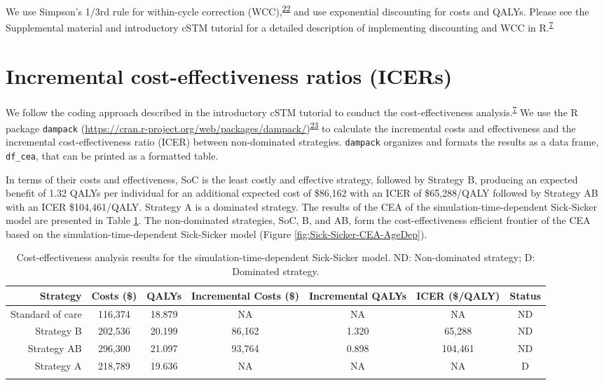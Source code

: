 \documentclass[
]{article}
\begin{document}
We use Simpson's 1/3rd rule for within-cycle correction (WCC),\textsuperscript{\protect\hyperlink{ref-Elbasha2016a}{22}} and use exponential discounting for costs and QALYs. Please see the Supplemental material and introductory cSTM tutorial for a detailed description of implementing discounting and WCC in R.\textsuperscript{\protect\hyperlink{ref-Alarid-Escudero2021a}{7}}

\hypertarget{incremental-cost-effectiveness-ratios-icers}{%
\section{Incremental cost-effectiveness ratios (ICERs)}\label{incremental-cost-effectiveness-ratios-icers}}

We follow the coding approach described in the introductory cSTM tutorial to conduct the cost-effectiveness analysis.\textsuperscript{\protect\hyperlink{ref-Alarid-Escudero2021a}{7}} We use the R package \texttt{dampack} (\url{https://cran.r-project.org/web/packages/dampack/})\textsuperscript{\protect\hyperlink{ref-Alarid-Escudero2021}{23}} to calculate the incremental costs and effectiveness and the incremental cost-effectiveness ratio (ICER) between non-dominated strategies. \texttt{dampack} organizes and formats the results as a data frame, \texttt{df\_cea}, that can be printed as a formatted table.

In terms of their costs and effectiveness, SoC is the least costly and effective strategy, followed by Strategy B, producing an expected benefit of 1.32 QALYs per individual for an additional expected cost of \$86,162 with an ICER of \$65,288/QALY followed by Strategy AB with an ICER \$104,461/QALY. Strategy A is a dominated strategy. The results of the CEA of the simulation-time-dependent Sick-Sicker model are presented in Table \ref{tab:table-cea}. The non-dominated strategies, SoC, B, and AB, form the cost-effectiveness efficient frontier of the CEA based on the simulation-time-dependent Sick-Sicker model (Figure \ref{fig:Sick-Sicker-CEA-AgeDep}).

\begin{table}[!h]

\caption{\label{tab:table-cea}Cost-effectiveness analysis results for the simulation-time-dependent Sick-Sicker model. ND: Non-dominated strategy; D: Dominated strategy.}
\centering
\begin{tabular}[t]{rcccccc}
\toprule{}
Strategy & Costs (\$) & QALYs & Incremental Costs (\$) & Incremental QALYs & ICER (\$/QALY) & Status\\
\midrule{}
Standard of care & 116,374 & 18.879 & NA & NA & NA & ND\\
Strategy B & 202,536 & 20.199 & 86,162 & 1.320 & 65,288 & ND\\
Strategy AB & 296,300 & 21.097 & 93,764 & 0.898 & 104,461 & ND\\
Strategy A & 218,789 & 19.636 & NA & NA & NA & D\\
\bottomrule{}
\end{tabular}
\end{table}
\end{document}

